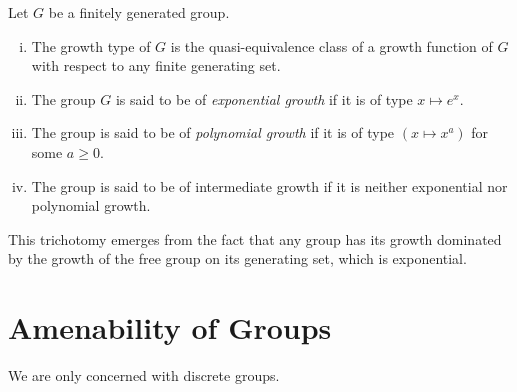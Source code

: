 \documentclass[10pt]{mypackage}
\begin{document}
\begin{definition}
  Let $G$ be a finitely generated group.
  \begin{enumerate}[(i)]
    \item The growth type of $G$ is the quasi-equivalence class of a growth function of $G$ with respect to any finite generating set.
    \item The group $G$ is said to be of \textit{exponential growth} if it is of type $x\mapsto e^{x}$.
    \item The group is said to be of \textit{polynomial growth} if it is of type $\left( x\mapsto x^{a} \right)$ for some $a \geq 0$.
    \item The group is said to be of intermediate growth if it is neither exponential nor polynomial growth.
  \end{enumerate}
\end{definition}
This trichotomy emerges from the fact that any group has its growth dominated by the growth of the free group on its generating set, which is exponential.
\section{Amenability of Groups}%
We are only concerned with discrete groups.
\end{document}
